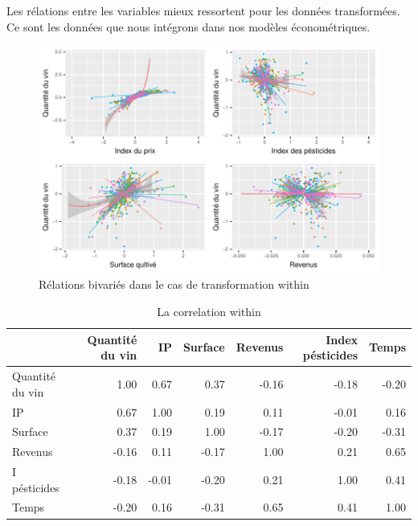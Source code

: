 \documentclass[11pt,]{article}
\begin{document}
Les rélations entre les variables mieux ressortent pour les données
transformées. Ce sont les données que nous intégrons dans nos modèles
économétriques.

\FloatBarrier

\begin{figure}[!htbp]

{\centering \includegraphics{note2pres_files/figure-latex/unnamed-chunk-55-1} 

}

\caption{Rélations bivariés dans le cas de transformation within}\label{fig:unnamed-chunk-55}
\end{figure}

\FloatBarrier

\FloatBarrier

\begin{table}[ht]
\centering
\begin{tabular}{l|rrrrrr}
  \hline
 & Quantité du vin & IP & Surface & Revenus & Index pésticides & Temps \\ 
  \hline
Quantité du vin & 1.00 & 0.67 & 0.37 & -0.16 & -0.18 & -0.20 \\ 
  IP & 0.67 & 1.00 & 0.19 & 0.11 & -0.01 & 0.16 \\ 
  Surface & 0.37 & 0.19 & 1.00 & -0.17 & -0.20 & -0.31 \\ 
  Revenus & -0.16 & 0.11 & -0.17 & 1.00 & 0.21 & 0.65 \\ 
  I pésticides & -0.18 & -0.01 & -0.20 & 0.21 & 1.00 & 0.41 \\ 
  Temps & -0.20 & 0.16 & -0.31 & 0.65 & 0.41 & 1.00 \\ 
   \hline
\end{tabular}
\caption{La correlation within} 
\end{table}
\end{document}
